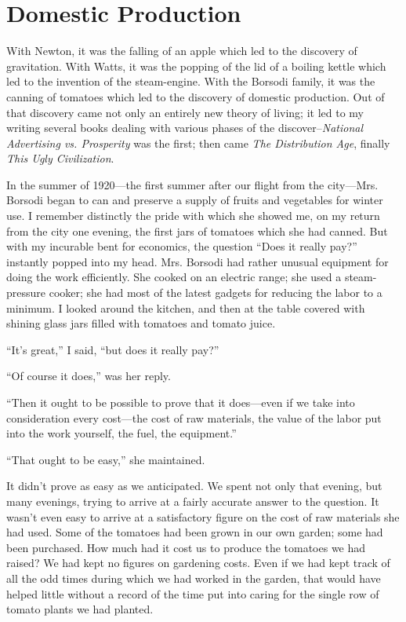 \documentclass{book}
\begin{document}
\chapter{Domestic Production}
\label{chapter-2}
With Newton, it was the falling of an apple which led to the discovery of gravitation. With Watts, it was the popping of the lid of a boiling kettle which led to the invention of the steam-engine. With the Borsodi family, it was the canning of tomatoes which led to the discovery of domestic production. Out of that discovery came not only an entirely new theory of living; it led to my writing several books dealing with various phases of the discover–\emph{National Advertising vs. Prosperity} was the first; then came \emph{The Distribution Age}, finally \emph{This Ugly Civilization}.

In the summer of 1920—the first summer after our flight from the city—Mrs. Borsodi began to can and preserve a supply of fruits and vegetables for winter use. I remember distinctly the pride with which she showed me, on my return from the city one evening, the first jars of tomatoes which she had canned. But with my incurable bent for economics, the question “Does it really pay?” instantly popped into my head. Mrs. Borsodi had rather unusual equipment for doing the work efficiently. She cooked on an electric range; she used a steam-pressure cooker; she had most of the latest gadgets for reducing the labor to a minimum. I looked around the kitchen, and then at the table covered with shining glass jars filled with tomatoes and tomato juice.

“It’s great,” I said, “but does it really pay?”

“Of course it does,” was her reply.

“Then it ought to be possible to prove that it does—even if we take into consideration every cost—the cost of raw materials, the value of the labor put into the work yourself, the fuel, the equipment.”

“That ought to be easy,” she maintained.

It didn’t prove as easy as we anticipated. We spent not only that evening, but many evenings, trying to arrive at a fairly accurate answer to the question. It wasn’t even easy to arrive at a satisfactory figure on the cost of raw materials she had used. Some of the tomatoes had been grown in our own garden; some had been purchased. How much had it cost us to produce the tomatoes we had raised? We had kept no figures on gardening costs. Even if we had kept track of all the odd times during which we had worked in the garden, that would have helped little without a record of the time put into caring for the single row of tomato plants we had planted.
\end{document}
